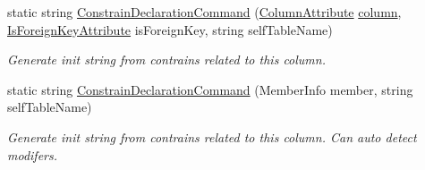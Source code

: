\begin{DoxyCompactItemize}
static string \mbox{\hyperlink{class_uniform_data_operator_1_1_sql_1_1_markup_1_1_is_foreign_key_attribute_a60708064b8a8d38e8df273e8a8f8fb3d}{Constrain\+Declaration\+Command}} (\mbox{\hyperlink{class_uniform_data_operator_1_1_sql_1_1_markup_1_1_column_attribute}{Column\+Attribute}} \mbox{\hyperlink{class_uniform_data_operator_1_1_sql_1_1_markup_1_1_is_foreign_key_attribute_aa305b69f1eac8e7335b9776b5d30625e}{column}}, \mbox{\hyperlink{class_uniform_data_operator_1_1_sql_1_1_markup_1_1_is_foreign_key_attribute}{Is\+Foreign\+Key\+Attribute}} is\+Foreign\+Key, string self\+Table\+Name)
\begin{DoxyCompactList}\small\item\em Generate init string from contrains related to this column. \end{DoxyCompactList}\item 
static string \mbox{\hyperlink{class_uniform_data_operator_1_1_sql_1_1_markup_1_1_is_foreign_key_attribute_ad02f765ed51d51466ebd143c083ff412}{Constrain\+Declaration\+Command}} (Member\+Info member, string self\+Table\+Name)
\begin{DoxyCompactList}\small\item\em Generate init string from contrains related to this column. Can auto detect modifers. \end{DoxyCompactList}\end{DoxyCompactItemize}
